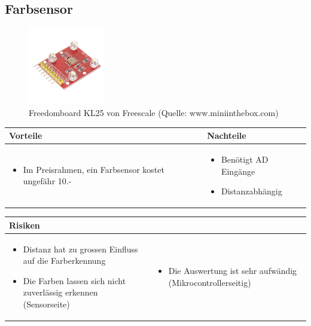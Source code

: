 

\subsection{Farbsensor}
\begin{figure}[h]
	\centering
	\includegraphics[width=0.3\textwidth]{fig/Farbsensor}
	\caption{Freedomboard KL25 von Freescale (Quelle: www.miniinthebox.com)}
\end{figure}


\begin{table}[h]
\begin{tabular}{p{} | p{}}


 \textbf{Vorteile} & \textbf{Nachteile} \\ \hline
	 
\begin{itemize}
\item Im Preisrahmen, ein Farbsensor kostet ungefähr 10.-
\end{itemize}

 &
 
\begin{itemize}
\item Benötigt  AD Eingänge
\item Distanzabhängig
\end{itemize}

\end{tabular}
\end{table}

\begin{table}[h]
\begin{tabular}{p{}p{}}


 \textbf{Risiken} & \\ \hline
	 
\begin{itemize}
\item Distanz hat zu grossen Einfluss auf die Farberkennung
\item Die Farben lassen sich nicht zuverlässig erkennen (Sensorseite)
\end{itemize}
&
\begin{itemize}
\item Die Auswertung ist sehr aufwändig (Mikrocontrollerseitig)
\end{itemize}

 
\end{tabular}
\end{table}

